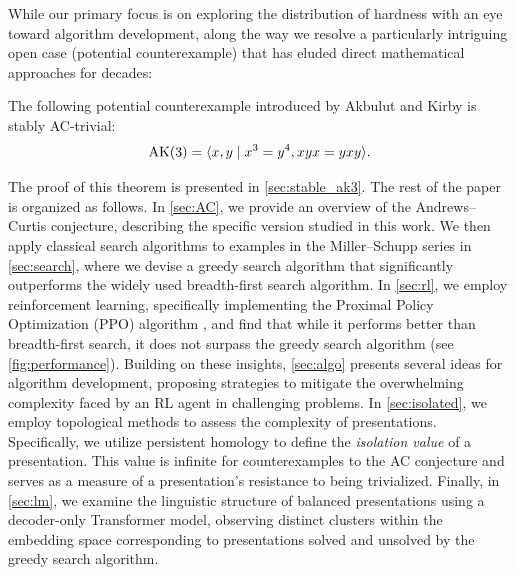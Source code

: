 While our primary focus is on exploring the distribution of hardness with an eye toward algorithm development, along the way we resolve a particularly intriguing open case (potential counterexample) that has eluded direct mathematical approaches for decades:

\begin{theorem}\label{thm:stableAK3}
    The following potential counterexample introduced by Akbulut and Kirby \cite{Akbulut--Kirby} is stably AC-trivial:
    \[
    \text{AK}(3) = \langle x, y \mid x^3 = y^{4}, xyx = yxy\rangle.
    \]
\end{theorem}

\noindent
The proof of this theorem is presented in \autoref{sec:stable_ak3}.
The rest of the paper is organized as follows. In \autoref{sec:AC}, we provide an overview of the Andrews--Curtis conjecture, describing the specific version studied in this work. We then apply classical search algorithms to examples in the Miller--Schupp series in \autoref{sec:search}, where we devise a greedy search algorithm that significantly outperforms the widely used breadth-first search algorithm. In \autoref{sec:rl}, we employ reinforcement learning, specifically implementing the Proximal Policy Optimization (PPO) algorithm \cite{schulman2017proximal}, and find that while it performs better than breadth-first search, it does not surpass the greedy search algorithm (see \autoref{fig:performance}). Building on these insights, \autoref{sec:algo} presents several ideas for algorithm development, proposing strategies to mitigate the overwhelming complexity faced by an RL agent in challenging problems. In \autoref{sec:isolated}, we employ topological methods to assess the complexity of presentations. Specifically, we utilize persistent homology to define the \textit{isolation value} of a presentation. This value is infinite for counterexamples to the AC conjecture and serves as a measure of a presentation's resistance to being trivialized. Finally, in \autoref{sec:lm}, we examine the linguistic structure of balanced presentations using a decoder-only Transformer model, observing distinct clusters within the embedding space corresponding to presentations solved and unsolved by the greedy search algorithm.

